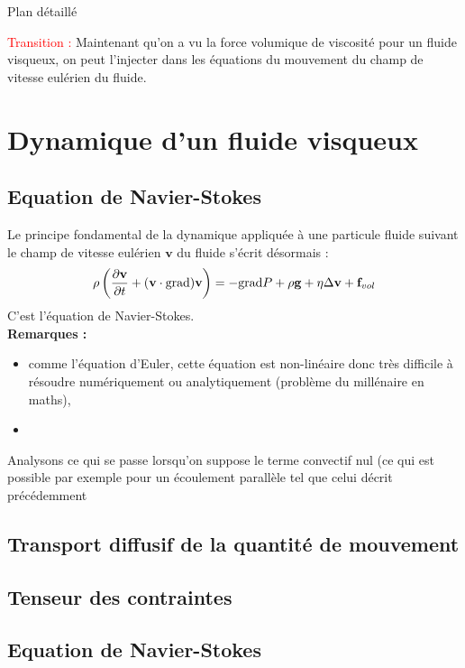\begin{reportBlock}{Plan détaillé}
  
  \textcolor{red}{Transition :} Maintenant qu'on a vu la force volumique de viscosité pour un fluide visqueux, on peut l'injecter dans les équations du mouvement du champ de vitesse eulérien du fluide.

  \section{Dynamique d'un fluide visqueux}

  \subsection{Equation de Navier-Stokes}
  Le principe fondamental de la dynamique appliquée à une particule fluide suivant le champ de vitesse eulérien $\mathbf{v}$ du fluide s'écrit désormais :
  \begin{equation}
      \rho\left(\frac{\partial \mathbf{v}}{\partial t} + (\mathbf{v}\cdot\mathbf{\mathrm{grad}})\mathbf{v}\right) = -\mathbf{\mathrm{grad}} P + \rho \mathbf{g} + \eta\Delta\mathbf{v} + \mathbf{f}_{vol}
  \end{equation}
  C'est l'équation de Navier-Stokes.\\
  \textbf{Remarques :}
  \begin{itemize}
      \item comme l'équation d'Euler, cette équation est non-linéaire donc très difficile à résoudre numériquement ou analytiquement (problème du millénaire en maths),
      \item 
  \end{itemize}
  Analysons ce qui se passe lorsqu'on suppose le terme convectif nul (ce qui est possible par exemple pour un écoulement parallèle tel que celui décrit précédemment


  \subsection{Transport diffusif de la quantité de mouvement}
\subsection{Tenseur des contraintes}

\subsection{Equation de Navier-Stokes}


\end{reportBlock}
